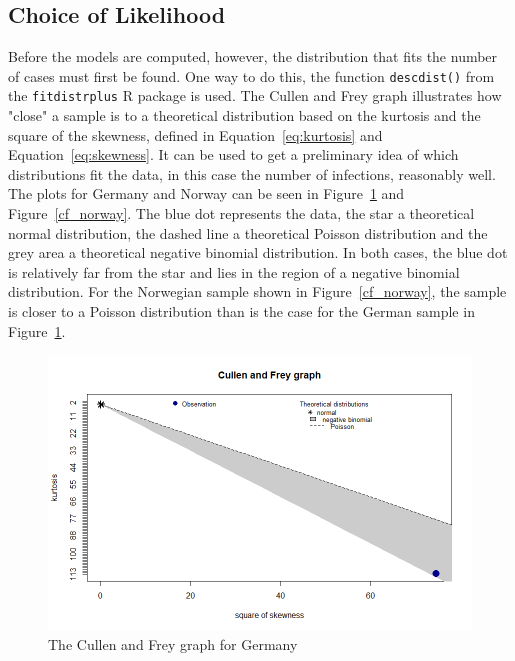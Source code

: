 \subsection{Choice of Likelihood}\label{sec:likelihood}
Before the models are computed, however, the distribution that fits the number of cases must first be found. One way to do this, the function \texttt{descdist()} from the \texttt{fitdistrplus} R package is used. The Cullen and Frey graph illustrates how "close" a sample is to a theoretical distribution based on the kurtosis and the square of the skewness, defined in Equation~\ref{eq:kurtosis} and Equation~\ref{eq:skewness}. It can be used to get a preliminary idea of which distributions fit the data, in this case the number of infections, reasonably well. \\
The plots for Germany and Norway can be seen in Figure~\ref{cf_germany} and Figure~\ref{cf_norway}. The blue dot represents the data, the star a theoretical normal distribution, the dashed line a theoretical Poisson distribution and the grey area a theoretical negative binomial distribution. In both cases, the blue dot is relatively far from the star and lies in the region of a negative binomial distribution. For the Norwegian sample shown in Figure~\ref{cf_norway}, the sample is closer to a Poisson distribution than is the case for the German sample in Figure~\ref{cf_germany}.
\begin{figure}[H]
  \centering
  \includegraphics[width = \textwidth]{cf_germany.png}
  \caption{The Cullen and Frey graph for Germany}
  \label{cf_germany}
\end{figure}
